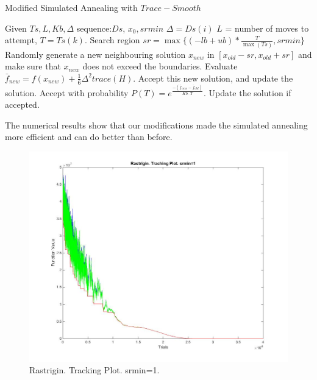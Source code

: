\documentclass[letterpaper,12pt,titlepage,oneside,final]{book}
\begin{document}
\begin{algorithm} [H]
\caption{Modified Simulated Annealing with $Trace-Smooth$}
\begin{algorithmic} 
\STATE Given $Ts, L, Kb, \Delta$ sequence:$Ds$, $x_0, srmin$
\STATE $\Delta=Ds(i)$
\STATE $L$ = number of moves to attempt, $T= Ts(k)$.
\STATE Search region $sr=\max\{(-lb+ub)*\frac{T}{\max(Ts)},srmin\}$
\STATE Randomly generate a new neighbouring solution $x_{new}$ in $[x_{old}-sr,x_{old}+sr]$ and make sure that $x_{new}$ does not exceed the boundaries.
\STATE Evaluate $\bar{f}_{new}=f(x_{new})+\frac{1}{6}\Delta^2trace(H)$.
\STATE Accept this new solution, and update the solution. 
\ELSE 
\STATE Accept with probability $P(T) = e^{\frac{-(\bar{f}_{new}-\bar{f}_{old})}{Kb\cdot T} }$. 
\STATE  Update the solution if accepted.
\ENDIF
\ENDFOR
\ENDFOR
\ENDFOR
\end{algorithmic}
\end{algorithm}

The numerical results show that our modifications made the simulated annealing more efficient and can do better than before. 

\begin{figure}[H]
\includegraphics[scale=0.5]{srmin1.jpg}
\caption{Rastrigin. Tracking Plot. srmin=1.}
\end{figure}
\end{document}
